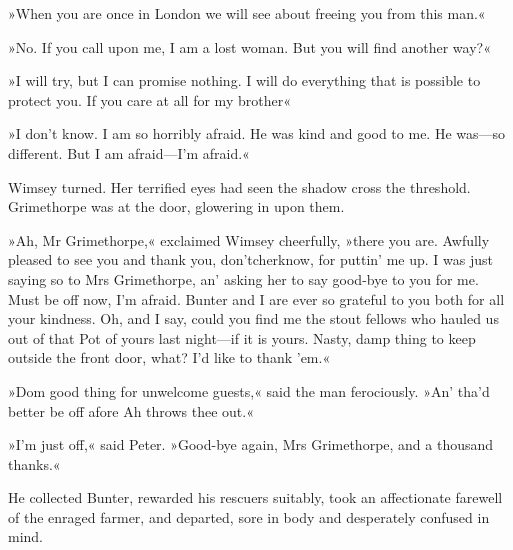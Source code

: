 »When you are once in London we will see about freeing you from this man.«

»No. If you call upon me, I am a lost woman. But you will find another way?«

»I will try, but I can promise nothing. I will do everything that is possible to protect you. If you care at all for my brother\longdash«

»I don't know. I am so horribly afraid. He was kind and good to me. He was\allowbreak---\allowbreak so different. But I am afraid\allowbreak---\allowbreak I'm afraid.«

Wimsey turned. Her terrified eyes had seen the shadow cross the threshold. Grimethorpe was at the door, glowering in upon them.

»Ah, Mr Grimethorpe,« exclaimed Wimsey cheerfully, »there you are.  Awfully pleased to see you and thank you, don'tcherknow, for puttin' me up. I was just saying so to Mrs Grimethorpe, an' asking her to say good-bye to you for me. Must be off now, I'm afraid. Bunter and I are ever so grateful to you both for all your kindness. Oh, and I say, could you find me the stout fellows who hauled us out of that Pot of yours last night\allowbreak---\allowbreak if it is yours. Nasty, damp thing to keep outside the front door, what? I'd like to thank 'em.«

»Dom good thing for unwelcome guests,« said the man ferociously. »An' tha'd better be off afore Ah throws thee out.«

»I'm just off,« said Peter. »Good-bye again, Mrs Grimethorpe, and a thousand thanks.«

He collected Bunter, rewarded his rescuers suitably, took an affectionate farewell of the enraged farmer, and departed, sore in body and desperately confused in mind. 
